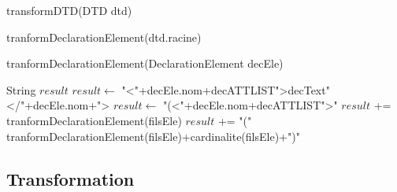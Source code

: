     \begin{algorithm}
	\caption{transformDTD(DTD dtd)}
    \begin{algorithmic}
	    \RETURN tranformDeclarationElement(dtd.racine) 
    \end{algorithmic}
    \end{algorithm}
        
    \begin{algorithm}
	\caption{tranformDeclarationElement(DeclarationElement decEle)}    
    \begin{algorithmic}
	    \STATE String $result$  
		    \STATE $result \gets$ "\textless"+decEle.nom+decATTLIST"\textgreater decText"\textless/"+decEle.nom+"\textgreater
	    \ELSE
		    \STATE $result \gets$ "(\textless"+decEle.nom+decATTLIST"\textgreater"
				    \STATE $result$ += tranformDeclarationElement(filsEle)
			    \ELSE
				    \STATE $result$ += "(" tranformDeclarationElement(filsEle)+cardinalite(filsEle)+")"
		        \ENDIF
	        \ENDFOR
	    \ENDIF
	\end{algorithmic}
    \end{algorithm}
        
    \subsection{Transformation}
